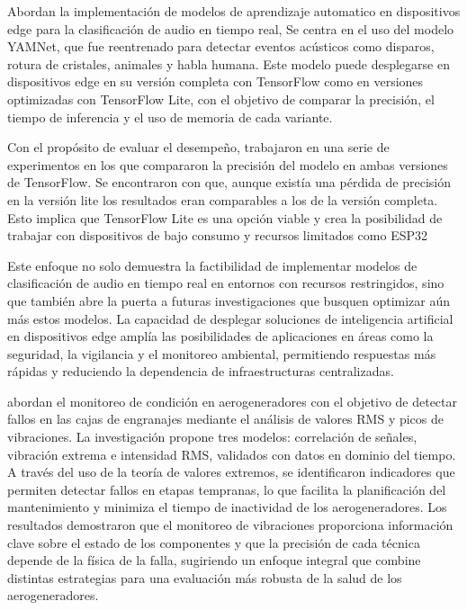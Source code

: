 

\citeauthor{malmberg_real-time_2021} \citeyear{malmberg_real-time_2021} Abordan la implementación de modelos de aprendizaje automatico en dispositivos edge para la clasificación de audio en tiempo real, Se centra en el uso del modelo YAMNet, que fue reentrenado para detectar eventos acústicos como disparos, rotura de cristales, animales y habla humana. Este modelo puede desplegarse en dispositivos edge en su versión completa con TensorFlow como en versiones optimizadas con TensorFlow Lite, con el objetivo de comparar la precisión, el tiempo de inferencia y el uso de memoria de cada variante.

Con el propósito de evaluar el desempeño, trabajaron en una serie de experimentos en los que compararon la precisión del modelo en ambas versiones de TensorFlow. Se encontraron con que, aunque existía una pérdida de precisión en la versión lite los resultados eran comparables a los de la versión completa. Esto implica que TensorFlow Lite es una opción viable y crea la posibilidad de trabajar con dispositivos de bajo consumo y recursos limitados como ESP32

Este enfoque no solo demuestra la factibilidad de implementar modelos de clasificación de audio en tiempo real en entornos con recursos restringidos, sino que también abre la puerta a futuras investigaciones que busquen optimizar aún más estos modelos. La capacidad de desplegar soluciones de inteligencia artificial en dispositivos edge amplía las posibilidades de aplicaciones en áreas como la seguridad, la vigilancia y el monitoreo ambiental, permitiendo respuestas más rápidas y reduciendo la dependencia de infraestructuras centralizadas.


\citeauthor{igba_analysing_2016} \citeyear{igba_analysing_2016} abordan el monitoreo de condición en aerogeneradores con el objetivo de detectar fallos en las cajas de engranajes mediante el análisis de valores RMS y picos de vibraciones. La investigación propone tres modelos: correlación de señales, vibración extrema e intensidad RMS, validados con datos en dominio del tiempo. A través del uso de la teoría de valores extremos, se identificaron indicadores que permiten detectar fallos en etapas tempranas, lo que facilita la planificación del mantenimiento y minimiza el tiempo de inactividad de los aerogeneradores. Los resultados demostraron que el monitoreo de vibraciones proporciona información clave sobre el estado de los componentes y que la precisión de cada técnica depende de la física de la falla, sugiriendo un enfoque integral que combine distintas estrategias para una evaluación más robusta de la salud de los aerogeneradores.

